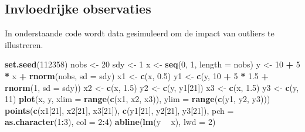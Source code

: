 \documentclass[12pt,dutch,coursenotes]{book}
\newenvironment{Shaded}{\begin{snugshade}}{\end{snugshade}}
\newcommand{\KeywordTok}[1]{\textcolor[rgb]{0.13,0.29,0.53}{\textbf{#1}}}
\newcommand{\DataTypeTok}[1]{\textcolor[rgb]{0.13,0.29,0.53}{#1}}
\newcommand{\DecValTok}[1]{\textcolor[rgb]{0.00,0.00,0.81}{#1}}
\newcommand{\FloatTok}[1]{\textcolor[rgb]{0.00,0.00,0.81}{#1}}
\newcommand{\StringTok}[1]{\textcolor[rgb]{0.31,0.60,0.02}{#1}}
\newcommand{\OperatorTok}[1]{\textcolor[rgb]{0.81,0.36,0.00}{\textbf{#1}}}
\newcommand{\NormalTok}[1]{#1}
\theoremstyle{definition}
\theoremstyle{definition}
\theoremstyle{definition}
\theoremstyle{remark}
\begin{document}
\subsection{Invloedrijke observaties}\label{invloedrijke-observaties}

In onderstaande code wordt data gesimuleerd om de impact van outliers te
illustreren.

\begin{Shaded}
\begin{Highlighting}[]
\KeywordTok{set.seed}\NormalTok{(}\DecValTok{112358}\NormalTok{)}
\NormalTok{nobs <-}\StringTok{ }\DecValTok{20}
\NormalTok{sdy <-}\StringTok{ }\DecValTok{1}
\NormalTok{x <-}\StringTok{ }\KeywordTok{seq}\NormalTok{(}\DecValTok{0}\NormalTok{, }\DecValTok{1}\NormalTok{, }\DataTypeTok{length =}\NormalTok{ nobs)}
\NormalTok{y <-}\StringTok{ }\DecValTok{10} \OperatorTok{+}\StringTok{ }\DecValTok{5} \OperatorTok{*}\StringTok{ }\NormalTok{x }\OperatorTok{+}\StringTok{ }\KeywordTok{rnorm}\NormalTok{(nobs, }\DataTypeTok{sd =}\NormalTok{ sdy)}
\NormalTok{x1 <-}\StringTok{ }\KeywordTok{c}\NormalTok{(x, }\FloatTok{0.5}\NormalTok{)}
\NormalTok{y1 <-}\StringTok{ }\KeywordTok{c}\NormalTok{(y, }\DecValTok{10} \OperatorTok{+}\StringTok{ }\DecValTok{5} \OperatorTok{*}\StringTok{ }\FloatTok{1.5} \OperatorTok{+}\StringTok{ }\KeywordTok{rnorm}\NormalTok{(}\DecValTok{1}\NormalTok{, }\DataTypeTok{sd =}\NormalTok{ sdy))}
\NormalTok{x2 <-}\StringTok{ }\KeywordTok{c}\NormalTok{(x, }\FloatTok{1.5}\NormalTok{)}
\NormalTok{y2 <-}\StringTok{ }\KeywordTok{c}\NormalTok{(y, y1[}\DecValTok{21}\NormalTok{])}
\NormalTok{x3 <-}\StringTok{ }\KeywordTok{c}\NormalTok{(x, }\FloatTok{1.5}\NormalTok{)}
\NormalTok{y3 <-}\StringTok{ }\KeywordTok{c}\NormalTok{(y, }\DecValTok{11}\NormalTok{)}
\KeywordTok{plot}\NormalTok{(x, y, }\DataTypeTok{xlim =} \KeywordTok{range}\NormalTok{(}\KeywordTok{c}\NormalTok{(x1, x2, x3)), }\DataTypeTok{ylim =} \KeywordTok{range}\NormalTok{(}\KeywordTok{c}\NormalTok{(y1, }
\NormalTok{    y2, y3)))}
\KeywordTok{points}\NormalTok{(}\KeywordTok{c}\NormalTok{(x1[}\DecValTok{21}\NormalTok{], x2[}\DecValTok{21}\NormalTok{], x3[}\DecValTok{21}\NormalTok{]), }\KeywordTok{c}\NormalTok{(y1[}\DecValTok{21}\NormalTok{], y2[}\DecValTok{21}\NormalTok{], }
\NormalTok{    y3[}\DecValTok{21}\NormalTok{]), }\DataTypeTok{pch =} \KeywordTok{as.character}\NormalTok{(}\DecValTok{1}\OperatorTok{:}\DecValTok{3}\NormalTok{), }\DataTypeTok{col =} \DecValTok{2}\OperatorTok{:}\DecValTok{4}\NormalTok{)}
\KeywordTok{abline}\NormalTok{(}\KeywordTok{lm}\NormalTok{(y }\OperatorTok{~}\StringTok{ }\NormalTok{x), }\DataTypeTok{lwd =} \DecValTok{2}\NormalTok{)}

\end{Highlighting}
\end{Shaded}
\end{document}
